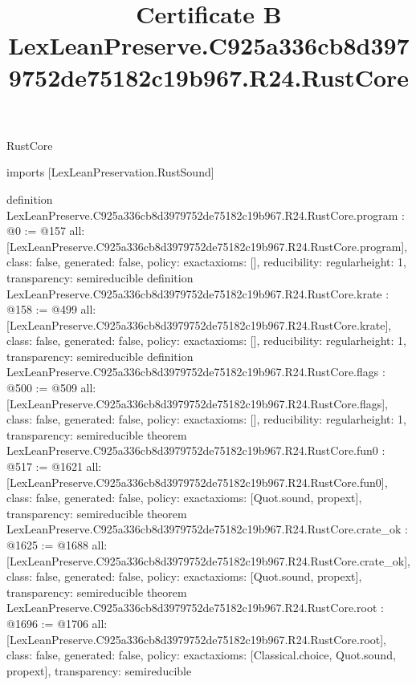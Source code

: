 \begin{lexlean}{RustCore}
\title{Certificate B LexLeanPreserve.C925a336cb8d3979752de75182c19b967.R24.RustCore}
\begin{coremodule}
imports [LexLeanPreservation.RustSound]

definition LexLeanPreserve.C925a336cb8d3979752de75182c19b967.R24.RustCore.program : @0 := @157 {
  all: [LexLeanPreserve.C925a336cb8d3979752de75182c19b967.R24.RustCore.program],
  class: false,
  generated: false,
  policy: exact{axioms: []},
  reducibility: regular{height: 1},
  transparency: semireducible
}
definition LexLeanPreserve.C925a336cb8d3979752de75182c19b967.R24.RustCore.krate : @158 := @499 {
  all: [LexLeanPreserve.C925a336cb8d3979752de75182c19b967.R24.RustCore.krate],
  class: false,
  generated: false,
  policy: exact{axioms: []},
  reducibility: regular{height: 1},
  transparency: semireducible
}
definition LexLeanPreserve.C925a336cb8d3979752de75182c19b967.R24.RustCore.flags : @500 := @509 {
  all: [LexLeanPreserve.C925a336cb8d3979752de75182c19b967.R24.RustCore.flags],
  class: false,
  generated: false,
  policy: exact{axioms: []},
  reducibility: regular{height: 1},
  transparency: semireducible
}
theorem LexLeanPreserve.C925a336cb8d3979752de75182c19b967.R24.RustCore.fun0 : @517 := @1621 {
  all: [LexLeanPreserve.C925a336cb8d3979752de75182c19b967.R24.RustCore.fun0],
  class: false,
  generated: false,
  policy: exact{axioms: [Quot.sound, propext]},
  transparency: semireducible
}
theorem LexLeanPreserve.C925a336cb8d3979752de75182c19b967.R24.RustCore.crate_ok : @1625 := @1688 {
  all: [LexLeanPreserve.C925a336cb8d3979752de75182c19b967.R24.RustCore.crate_ok],
  class: false,
  generated: false,
  policy: exact{axioms: [Quot.sound, propext]},
  transparency: semireducible
}
theorem LexLeanPreserve.C925a336cb8d3979752de75182c19b967.R24.RustCore.root : @1696 := @1706 {
  all: [LexLeanPreserve.C925a336cb8d3979752de75182c19b967.R24.RustCore.root],
  class: false,
  generated: false,
  policy: exact{axioms: [Classical.choice, Quot.sound, propext]},
  transparency: semireducible
}


\end{coremodule}
\end{lexlean}
